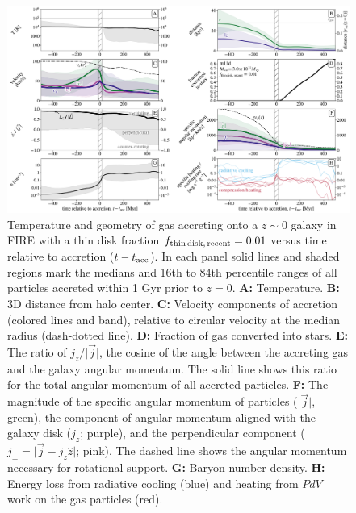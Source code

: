 \documentclass[fleqn,usenatbib]{mnras}
\newcommand{\fthin}{f_{\rm thin\,disk,\,recent}}
\newcommand{\tacc}{t_{\rm acc}}
\begin{document}
\begin{figure}\includegraphics[width=\textwidth]{figures/variations/relative_to_accretion/before_and_after/before_and_after_allone_m11d_md.pdf}
\caption{
Temperature and geometry of gas accreting onto a $z\sim0$ galaxy in FIRE with a thin disk fraction $\fthin=0.01$ versus time relative to accretion ($t - \tacc$).
In each panel solid lines and shaded regions mark the medians and 16th to 84th percentile ranges of all particles accreted within 1 Gyr prior to $z=0$.
\textbf{A:} Temperature.
\textbf{B:} 3D distance from halo center.
\textbf{C:} Velocity components of accretion (colored lines and band), relative to circular velocity at the median radius (dash-dotted line).
\textbf{D:} Fraction of gas converted into stars.
\textbf{E:} The ratio of $j_z / \vert \vec j \vert$, the cosine of the angle between the accreting gas and the galaxy angular momentum.
The solid line shows this ratio for the total angular momentum of all accreted particles.
\textbf{F:} The magnitude of the specific angular momentum of particles ($\vert\vec{j}\vert$, green), the component of angular momentum aligned with the galaxy disk ($j_z$; purple), and the perpendicular component ($j_{\perp} = \vert \vec{j} - j_z \hat{z} \vert$; pink).
The dashed line shows the angular momentum necessary for rotational support.
\textbf{G:} Baryon number density.
\textbf{H:} Energy loss from radiative cooling (blue) and heating from $PdV$ work on the gas particles (red).
}
\label{f: m11d}
\end{figure}
\end{document}
